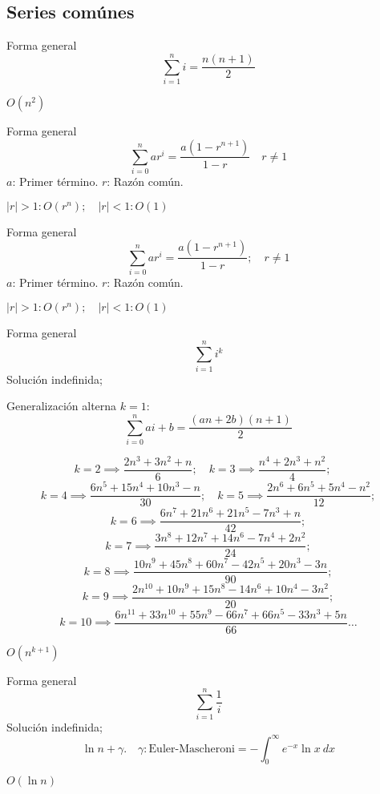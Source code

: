 \subsection{Series comúnes}

\begin{definition}[Aritmética]
	Forma general
	$$ \sum_{i=1}^ni = \frac{n(n+1)}2 $$
	\begin{fact}[Orden]
		$O(n^2)$
	\end{fact}
\end{definition}

\begin{definition}[Geométrica]
	Forma general
	$$ \sum_{i=0}^nar^i = \frac{a(1-r^{n+1})}{1-r}\quad r\ne1 $$
	$a$: Primer término. $r$: Razón común.
	\begin{fact}[Orden]
		$|r|>1:O(r^n);\quad|r|<1:O(1)$
	\end{fact}
\end{definition}

\begin{definition}[Base 2]
	Forma general
	$$ \sum_{i=0}^nar^i = \frac{a(1-r^{n+1})}{1-r};\quad r\ne1 $$
	$a$: Primer término. $r$: Razón común.
	\begin{fact}[Orden]
		$|r|>1:O(r^n);\quad|r|<1:O(1)$
	\end{fact}
\end{definition}

\begin{definition}[Potencias]
	Forma general
	$$ \sum_{i=1}^ni^k$$
	Solución indefinida;
	\begin{remark}Generalización alterna $k=1$:
		$$\sum_{i=0}^nai+b=\frac{(an+2b)(n+1)}2$$
	\end{remark}
	$$
		k=2\implies\frac{2n^3+3n^2+n}6;\quad
		k=3\implies\frac{n^4+2n^3+n^2}4;\quad
	$$ $$
		k=4\implies\frac{6n^5+15n^4+10n^3-n}{30};\quad
		k=5\implies\frac{2n^6+6n^5+5n^4-n^2}{12};
	$$ $$
		k=6\implies\frac{6n^7+21n^6+21n^5-7n^3+n}{42};
	$$ $$
		k=7\implies\frac{3n^8+12n^7+14n^6-7n^4+2n^2}{24};
	$$ $$
		k=8\implies\frac{10n^9+45n^8+60n^7-42n^5+20n^3-3n}{90};
	$$ $$
		k=9\implies\frac{2n^{10}+10n^9+15n^8-14n^6+10n^4-3n^2}{20};
	$$ $$
		k=10\implies\frac{6n^{11}+33n^{10}+55n^9-66n^7+66n^5-33n^3+5n}{66}\dots
	$$

	\begin{fact}[Orden]
		$O(n^{k+1})$
	\end{fact}
\end{definition}

\begin{definition}[Armónica]
	Forma general
	$$ \sum_{i=1}^n\frac1i$$
	Solución indefinida;
	$$ \ln n+\gamma.\quad\gamma:\text{Euler-Mascheroni}=-\int_0^\infty e^{-x}\ln x~dx $$
	\begin{fact}[Orden]
		$O(\ln n)$
	\end{fact}
\end{definition}


